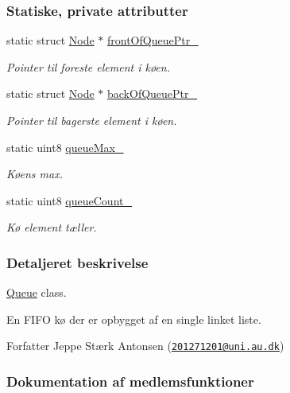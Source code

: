 \subsubsection*{Statiske, private attributter}
\begin{DoxyCompactItemize}
\item 
static struct \hyperlink{queue_8c_struct_node}{Node} $\ast$ \hyperlink{class_queue_aa48f05218d0a78402821c8aa9bdad06a}{front\+Of\+Queue\+Ptr\+\_\+}
\begin{DoxyCompactList}\small\item\em Pointer til foreste element i køen. \end{DoxyCompactList}\item 
static struct \hyperlink{queue_8c_struct_node}{Node} $\ast$ \hyperlink{class_queue_a225d2c9ad4e83d6da443e99b8869a51c}{back\+Of\+Queue\+Ptr\+\_\+}
\begin{DoxyCompactList}\small\item\em Pointer til bagerste element i køen. \end{DoxyCompactList}\item 
static uint8 \hyperlink{class_queue_acb6b6e88c9e4d12839594b31e6ff7c5a}{queue\+Max\+\_\+}
\begin{DoxyCompactList}\small\item\em Køens max. \end{DoxyCompactList}\item 
static uint8 \hyperlink{class_queue_ad260f9ccca00e80d161bbf3e70c3ffa6}{queue\+Count\+\_\+}
\begin{DoxyCompactList}\small\item\em Kø element tæller. \end{DoxyCompactList}\end{DoxyCompactItemize}


\subsubsection{Detaljeret beskrivelse}
\hyperlink{class_queue}{Queue} class. 

En F\+I\+FO kø der er opbygget af en single linket liste. \begin{DoxyAuthor}{Forfatter}
Jeppe Stærk Antonsen (\href{mailto:201271201@uni.au.dk}{\tt 201271201@uni.\+au.\+dk}) 
\end{DoxyAuthor}


\subsubsection{Dokumentation af medlemsfunktioner}
